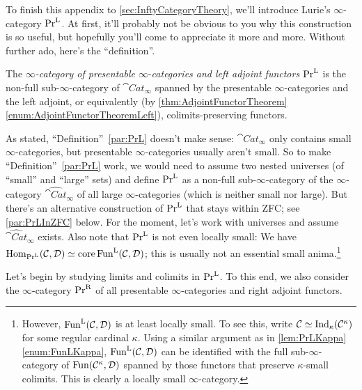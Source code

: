 To finish this appendix to \cref{sec:InftyCategoryTheory}, we'll introduce Lurie's $\infty$-category $\mathrm{Pr}^{\mathrm{L}}$. At first, it'll probably not be obvious to you why this construction is so useful, but hopefully you'll come to appreciate it more and more. Without further ado, here's the \enquote{definition}.
\begin{numpar}\label{par:PrL}
	The \emph{$\infty$-category of presentable $\infty\text{-}$categories and left adjoint functors} $\mathrm{Pr}^{\mathrm{L}}$ is the non-full sub-$\infty$-category of $\cat{Cat}_\infty$ spanned by the presentable $\infty$-categories and the left adjoint, or equivalently (by \cref{thm:AdjointFunctorTheorem}\cref{enum:AdjointFunctorTheoremLeft}), colimits-preserving functors.
\end{numpar}
As stated, \enquote{Definition}~\cref{par:PrL} doesn't make sense: $\cat{Cat}_\infty$ only contains small $\infty$-categories, but presentable $\infty$-categories usually aren't small. So to make \enquote{Definition}~\cref{par:PrL} work, we would need to assume two nested universes (of \enquote{small} and \enquote{large} sets) and define $\mathrm{Pr}^{\mathrm{L}}$ as a  non-full sub-$\infty$-category of the $\infty$-category $\widehat{\cat{Cat}}_\infty$ of all large $\infty$-categories (which is neither small nor large). But there's an alternative construction of $\Pr^{\mathrm{L}}$ that stays within ZFC; see \cref{par:PrLInZFC} below. For the moment, let's work with universes and assume $\widehat{\cat{Cat}}_\infty$ exists. Also note that $\mathrm{Pr}^{\mathrm{L}}$ is not even locally small: We have $\operatorname{Hom}_{\mathrm{Pr}^{\mathrm{L}}}(\mathcal{C},\mathcal{D})\simeq \operatorname{core} \operatorname{Fun}^{\mathrm{L}}(\mathcal{C},\mathcal{D})$; this is usually not an essential small anima.\footnote{However, $\operatorname{Fun}^{\mathrm{L}}(\mathcal{C},\mathcal{D})$ is at least locally small. To see this, write $\mathcal{C}\simeq \mathrm{Ind}_\kappa(\mathcal{C}^\kappa)$ for some regular cardinal $\kappa$. Using a similar argument as in \cref{lem:PrLKappa}\cref{enum:FunLKappa}, $\operatorname{Fun}^{\mathrm{L}}(\mathcal{C},\mathcal{D})$ can be identified with the full sub-$\infty$-category of $\operatorname{Fun}(\mathcal{C}^\kappa,\mathcal{D})$ spanned by those functors that preserve $\kappa$-small colimits. This is clearly a locally small $\infty$-category.} %

Let's begin by studying limits and colimits in $\mathrm{Pr}^{\mathrm{L}}$. To this end, we also consider the $\infty$-category $\mathrm{Pr}^{\mathrm{R}}$ of all presentable $\infty$-categories and right adjoint functors.

